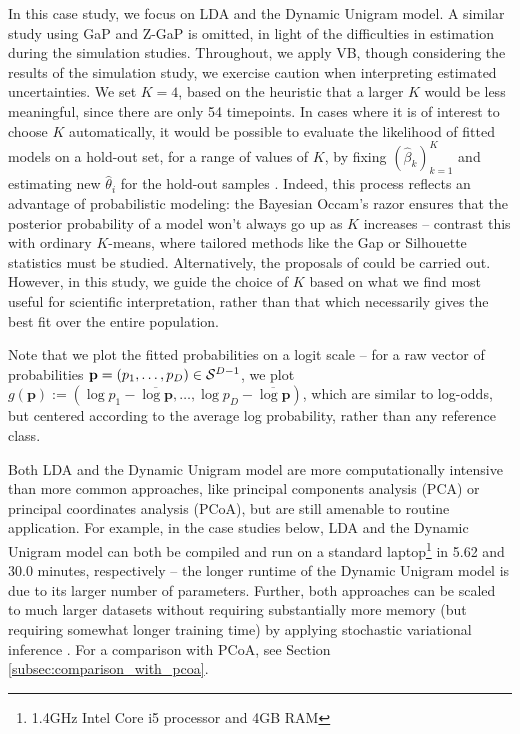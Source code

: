 In this case study, we focus on LDA and the Dynamic Unigram model. A similar
study using GaP and Z-GaP is omitted, in light of the difficulties in estimation
during the simulation studies. Throughout, we apply VB, though considering the
results of the simulation study, we exercise caution when interpreting estimated
uncertainties. We set $K = 4$, based on the heuristic that a larger $K$ would be
less meaningful, since there are only 54 timepoints. In cases where it is of
interest to choose $K$ automatically, it would be possible to evaluate the
likelihood of fitted models on a hold-out set, for a range of values of $K$, by
fixing $\left(\hat{\beta}_{k}\right)_{k = 1}^{K}$ and estimating new
$\hat{\theta}_{i}$ for the hold-out samples \citep{blei2003latent}. Indeed, this
process reflects an advantage of probabilistic modeling: the Bayesian Occam's
razor ensures that the posterior probability of a model won't always go up as
$K$ increases -- contrast this with ordinary $K$-means, where tailored methods
like the Gap or Silhouette statistics must be studied. Alternatively, the
proposals of \citep{wallach2009evaluation} could be carried out. However, in
this study, we guide the choice of $K$ based on what we find most useful for
scientific interpretation, rather than that which necessarily gives the best fit
over the entire population.

Note that we plot the fitted probabilities on a logit scale -- for a raw vector
of probabilities $\mathbf{p} = \left(p_{1}, \dots, p_{D}\right) \in
\mathcal{S}^{D - 1}$, we plot $g\left(\mathbf{p}\right) := \left(\log p_{1} -
\overline{\log \mathbf{p}}, \dots, \log p_{D} - \overline{\log
  \mathbf{p}}\right)$, which are similar to log-odds, but centered according to
the average log probability, rather than any reference class.

Both LDA and the Dynamic Unigram model are more computationally intensive than
more common approaches, like principal components analysis (PCA) or
principal coordinates analysis (PCoA), but are still amenable to routine application.
For example, in the case studies below, LDA and the Dynamic Unigram model can
both be compiled and run on a standard laptop\footnote{1.4GHz Intel Core i5
  processor and 4GB RAM} in 5.62 and 30.0 minutes, respectively -- the longer
runtime of the Dynamic Unigram model is due to its larger number of parameters.
Further, both approaches can be scaled to much larger datasets without requiring
substantially more memory (but requiring somewhat longer training time) by
applying stochastic variational inference \citep{hoffman2013stochastic}. For a
comparison with PCoA, see Section \ref{subsec:comparison_with_pcoa}.

